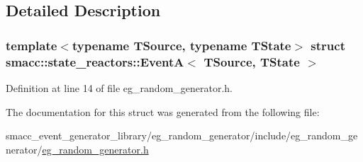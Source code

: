 \subsection{Detailed Description}
\subsubsection*{template$<$typename T\+Source, typename T\+State$>$\newline
struct smacc\+::state\+\_\+reactors\+::\+Event\+A$<$ T\+Source, T\+State $>$}



Definition at line 14 of file eg\+\_\+random\+\_\+generator.\+h.



The documentation for this struct was generated from the following file\+:\begin{DoxyCompactItemize}
\item 
smacc\+\_\+event\+\_\+generator\+\_\+library/eg\+\_\+random\+\_\+generator/include/eg\+\_\+random\+\_\+generator/\hyperlink{eg__random__generator_8h}{eg\+\_\+random\+\_\+generator.\+h}\end{DoxyCompactItemize}
